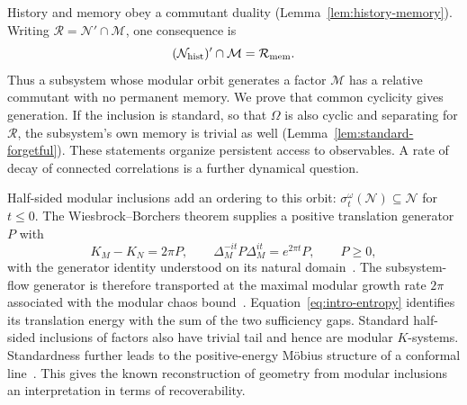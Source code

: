 \documentclass[a4paper,11pt]{article}
\theoremstyle{definition}
\begin{document}
History and memory obey a commutant duality (Lemma~\ref{lem:history-memory}). Writing $\mathcal R=\mathcal N'\cap\mathcal M$, one consequence is
\begin{equation}
 (\mathcal N_{\rm hist})'\cap\mathcal M=\mathcal R_{\rm mem}.
\end{equation}
Thus a subsystem whose modular orbit generates a factor $\mathcal M$ has a relative commutant with no permanent memory. We prove that common cyclicity gives generation. If the inclusion is standard, so that $\Omega$ is also cyclic and separating for $\mathcal R$, the subsystem's own memory is trivial as well (Lemma~\ref{lem:standard-forgetful}). These statements organize persistent access to observables. A rate of decay of connected correlations is a further dynamical question.

Half-sided modular inclusions add an ordering to this orbit: $\sigma_t^\omega(\mathcal N)\subseteq\mathcal N$ for $t\le0$. The Wiesbrock--Borchers theorem supplies a positive translation generator $P$ with
\begin{equation}
 K_M-K_N=2\pi P,
 \qquad
 \Delta_M^{-it}P\Delta_M^{it}=e^{2\pi t}P,
 \qquad P\ge0,
\end{equation}
with the generator identity understood on its natural domain~\cite{Wiesbrock1993,Borchers1992,ArakiZsido2005}. The subsystem-flow generator is therefore transported at the maximal modular growth rate $2\pi$ associated with the modular chaos bound~\cite{deBoerLamprou2020}. Equation~\eqref{eq:intro-entropy} identifies its translation energy with the sum of the two sufficiency gaps. Standard half-sided inclusions of factors also have trivial tail and hence are modular $K$-systems. Standardness further leads to the positive-energy M\"obius structure of a conformal line~\cite{Wiesbrock1993b,GuidoLongoWiesbrock1998}. This gives the known reconstruction of geometry from modular inclusions an interpretation in terms of recoverability.
\end{document}
